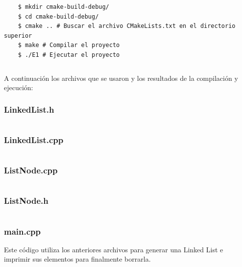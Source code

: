 \documentclass[]{article}
\newenvironment{code}{\captionsetup{type=listing}}{}
\begin{document}
\begin{verbatim}
	$ mkdir cmake-build-debug/
	$ cd cmake-build-debug/
	$ cmake .. # Buscar el archivo CMakeLists.txt en el directorio superior
	$ make # Compilar el proyecto
	$ ./E1 # Ejecutar el proyecto
\end{verbatim}

\begin{code}
	\inputminted{cmake}{../E1/CMakeLists.txt}
\end{code}

A continuación los archivos que se usaron y los resultados de la compilación y ejecución:

\subsubsection*{LinkedList.h}
\begin{code}
	\inputminted{c}{../E1/LinkedList.h}
\end{code}

\subsubsection*{LinkedList.cpp}
\begin{code}
	\inputminted{cpp}{../E1/LinkedList.cpp}
\end{code}

\subsubsection*{ListNode.cpp}
\begin{code}
	\inputminted{cpp}{../E1/ListNode.cpp}
\end{code}

\subsubsection*{ListNode.h}
\begin{code}
	\inputminted{c}{../E1/ListNode.h}
\end{code}

\subsubsection*{main.cpp}
Este código utiliza los anteriores archivos para generar una Linked List e imprimir sus elementos para finalmente borrarla.
\begin{code}
	\inputminted{cpp}{../E1/main.cpp}
\end{code}
\end{document}
